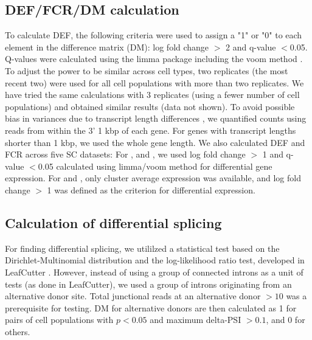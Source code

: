 \subsection{DEF/FCR/DM calculation}
To calculate DEF, the following criteria were used to assign a "1" or "0" to each element in the difference matrix (DM): log fold change $>$ 2 and q-value $<$0.05. Q-values were calculated using the limma package including the voom method \citep{Law_2014}. To adjust the power to be similar across cell types, two replicates (the most recent two) were used for all cell populations with more than two replicates. We have tried the same calculations with 3 replicates (using a fewer number of cell populations) and obtained similar results (data not shown). To avoid possible bias in variances due to transcript length differences \citep{Oshlack_2009}, we quantified counts using reads from within the 3' 1 kbp of each gene. For genes with transcript lengths shorter than 1 kbp, we used the whole gene length. 
We also calculated DEF and FCR across five SC datasets: For \cite{Zeisel_2015}, \cite{Tasic_2016} and \cite{Tasic_2018}, we used log fold change $>$ 1 and q-value $<$0.05 calculated using limma/voom method for differential gene expression. For \cite{Saunders_2018} and \cite{Zeisel_2018}, only cluster average expression was available, and log fold change $>$ 1 was defined as the criterion for differential expression.


\subsection{Calculation of differential splicing}
For finding differential splicing, we utililzed a statistical test based on the Dirichlet-Multinomial distribution and the log-likelihood ratio test, developed in LeafCutter \citep{Li_2016}. However, instead of using a group of connected introns as a unit of tests (as done in LeafCutter), we used a group of introns originating from an alternative donor site. Total junctional reads at an alternative donor $> 10$ was a prerequisite for testing. DM for alternative donors are then calculated as 1 for pairs of cell populations with $p < 0.05$ and maximum delta-PSI $> 0.1$, and 0 for others. 

